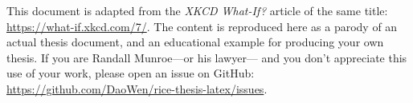 \begin{acknowledge}

This document is adapted from the \textit{XKCD What-If?} article of the same title:
\url{https://what-if.xkcd.com/7/}.
The content is reproduced here as a parody of an actual thesis document,
and an educational example for producing your own thesis.
If you are Randall Munroe---or his lawyer---%
and you don't appreciate this use of your work,
please open an issue on GitHub:
\url{https://github.com/DaoWen/rice-thesis-latex/issues}.

\end{acknowledge}
